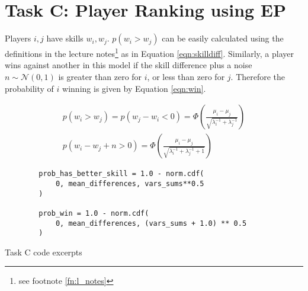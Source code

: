 \documentclass[11pt]{amsart}
\begin{document}
\section{Task C: Player Ranking using EP}
Players $ i,j $ have skills $ w_i, w_j $. $ p(w_i > w_j) $ can be easily calculated using the definitions in the lecture notes\footnote{see footnote \ref{fn:l_notes}} as in Equation \ref{eqn:skilldiff}. Similarly, a player wins against another in this model if the skill difference plus a noise $ n \sim \mathcal{N}(0,1)$ is greater than zero for $i$, or less than zero for $j$. Therefore the probability of $i$ winning is given by Equation \ref{eqn:win}.

\begin{eqnarray}
    p(w_i > w_j) = p(w_j-w_i < 0) =\Phi \left(\frac{\mu_i - \mu_j}{\sqrt{\lambda_i^{-1} + \lambda_j^{-1}}}\right) \\ \label{eqn:skilldiff}
    p(w_i - w_j + n > 0) = \Phi \left(\frac{\mu_i - \mu_j}{\sqrt{\lambda_i^{-1} + \lambda_j^{-1} + 1}}\right) \label{eqn:win}
\end{eqnarray}

\begin{listing}[h]
    \begin{verbatim}
        prob_has_better_skill = 1.0 - norm.cdf(
            0, mean_differences, vars_sums**0.5
        )

        prob_win = 1.0 - norm.cdf(
            0, mean_differences, (vars_sums + 1.0) ** 0.5
        )
    \end{verbatim}
    \caption{Task C code excerpts} \label{lst:cw2c}
\end{listing}
\end{document}
